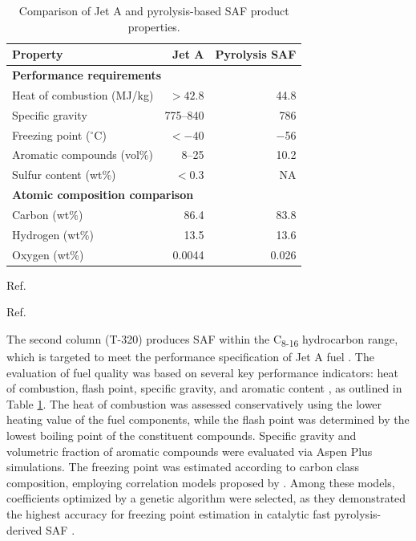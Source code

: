 \documentclass[11pt]{article}
\begin{document}
\begin{table}[tb]
\centering
\caption{Comparison of Jet A and pyrolysis-based SAF product properties.}
\begin{threeparttable}
\begin{tabular}{l r r}
\toprule
\textbf{Property} & \textbf{Jet A} & \textbf{Pyrolysis SAF} \\
\midrule
\multicolumn{3}{l}{\textbf{Performance requirements}\tnote{a}} \\
Heat of combustion (MJ/kg) & $> 42.8 $ & 44.8 \\
Specific gravity  & 775--840  & 786 \\
Freezing point ($^\circ$C) & $< -40 $ & $-$56 \\
Aromatic compounds (vol\%) & 8--25  & 10.2  \\
Sulfur content (wt\%) & $< 0.3 $ & NA \\
\midrule
\multicolumn{3}{l}{\textbf{Atomic composition comparison}\tnote{b}} \\
Carbon  (wt\%) & 86.4 & 83.8 \\
Hydrogen  (wt\%) & 13.5  & 13.6  \\
Oxygen  (wt\%) & 0.0044 & 0.026  \\
\bottomrule
\end{tabular}
\begin{tablenotes}
\footnotesize
\item[a] Ref. \cite{lahijani2022upgrading} 
\item[b] Ref. \cite{zhang2015production}
\end{tablenotes}
\end{threeparttable}
\label{tab:saf-spec}
\end{table}

    The second column (T-320) produces SAF within the C\textsubscript{8-16} hydrocarbon range, which is targeted to meet the performance specification of Jet A fuel \cite{Davidson2014}. 
    The evaluation of fuel quality was based on several key performance indicators: heat of combustion, flash point, specific gravity, and aromatic content \cite{lahijani2022upgrading}, as outlined in Table \ref{tab:saf-spec}.
    The heat of combustion was assessed conservatively using the lower heating value of the fuel components, while the flash point was determined by the lowest boiling point of the constituent compounds. 
    Specific gravity and volumetric fraction of aromatic compounds were evaluated via Aspen Plus simulations.
    The freezing point was estimated according to carbon class composition, employing correlation models proposed by \cite{shi2017quantitative}.
    Among these models, coefficients optimized by a genetic algorithm were selected, as they demonstrated the highest accuracy for freezing point estimation in catalytic fast pyrolysis-derived SAF \cite{watanasiri2023prediction}. 
\end{document}
